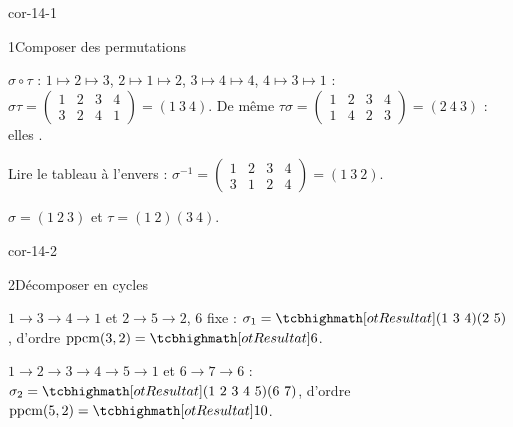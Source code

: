 
\corrigesSouples

\begin{blocLivre}{cor-14-1}
\begin{corrige}{1}{Composer des permutations}
\begin{questions}
  \item $\sigma\circ\tau$ : $1\mapsto2\mapsto3$, $2\mapsto1\mapsto2$,
    $3\mapsto4\mapsto4$, $4\mapsto3\mapsto1$ :
    $\sigma\tau=\begin{pmatrix}1&2&3&4\\3&2&4&1\end{pmatrix}=(1\ 3\ 4)$.
    De même $\tau\sigma=\begin{pmatrix}1&2&3&4\\1&4&2&3\end{pmatrix}
    =(2\ 4\ 3)$ : elles .
  \item Lire le tableau à l'envers :
    $\sigma^{-1}=\begin{pmatrix}1&2&3&4\\3&1&2&4\end{pmatrix}=(1\ 3\ 2)$.
  \item $\sigma=(1\ 2\ 3)$ et $\tau=(1\ 2)(3\ 4)$.
\end{questions}
\end{corrige}
\end{blocLivre}

\begin{blocLivre}{cor-14-2}
\begin{corrige}{2}{Décomposer en cycles}
\begin{questions}
  \item $1\to3\to4\to1$ et $2\to5\to2$, $6$ fixe :
    $\sigma_1=\res{(1\ 3\ 4)(2\ 5)}$, d'ordre
    $\operatorname{ppcm}(3,2)=\res{6}$.
  \item $1\to2\to3\to4\to5\to1$ et $6\to7\to6$ :
    $\sigma_2=\res{(1\ 2\ 3\ 4\ 5)(6\ 7)}$, d'ordre
    $\operatorname{ppcm}(5,2)=\res{10}$.
\end{questions}
\end{corrige}
\end{blocLivre}

